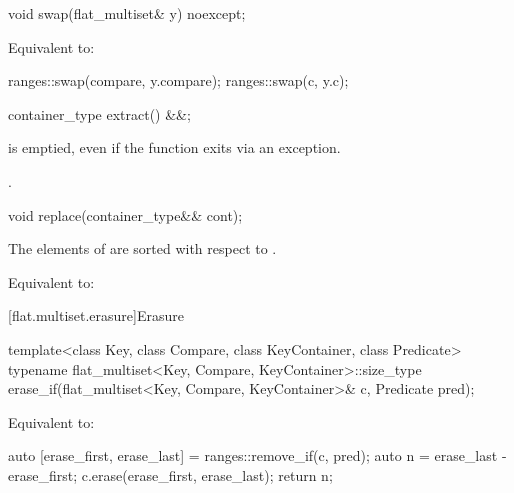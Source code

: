%
\begin{itemdecl}
void swap(flat_multiset& y) noexcept;
\end{itemdecl}

\begin{itemdescr}
\pnum
\effects
Equivalent to:
\begin{codeblock}
ranges::swap(compare, y.compare);
ranges::swap(c, y.c);
\end{codeblock}
\end{itemdescr}

%
\begin{itemdecl}
container_type extract() &&;
\end{itemdecl}

\begin{itemdescr}
\pnum
\ensures
{} is emptied, even if the function exits via an exception.

\pnum
\returns
{}.
\end{itemdescr}

%
\begin{itemdecl}
void replace(container_type&& cont);
\end{itemdecl}

\begin{itemdescr}
\pnum
\expects
The elements of  are sorted with respect to .

\pnum
\effects
Equivalent to: 
\end{itemdescr}

[flat.multiset.erasure]{Erasure}

%
\begin{itemdecl}
template<class Key, class Compare, class KeyContainer, class Predicate>
  typename flat_multiset<Key, Compare, KeyContainer>::size_type
    erase_if(flat_multiset<Key, Compare, KeyContainer>& c, Predicate pred);
\end{itemdecl}

\begin{itemdescr}
\pnum
\effects
Equivalent to:
\begin{codeblock}
auto [erase_first, erase_last] = ranges::remove_if(c, pred);
auto n = erase_last - erase_first;
c.erase(erase_first, erase_last);
return n;
\end{codeblock}
\end{itemdescr}


